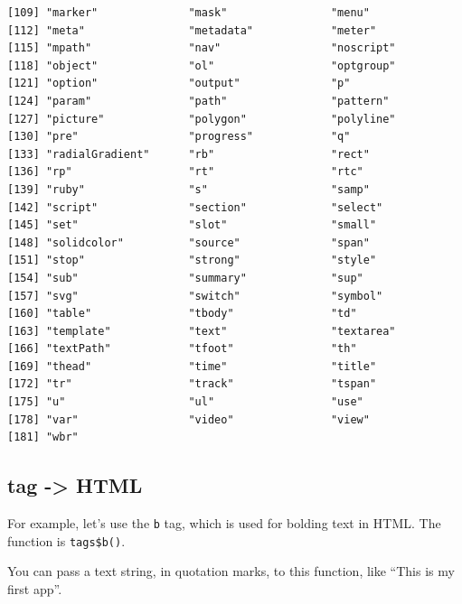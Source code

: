 \documentclass[
  letterpaper,
  DIV=11,
  numbers=noendperiod]{scrreprt}
\newenvironment{Shaded}{\begin{snugshade}}{\end{snugshade}}
\newcommand{\FunctionTok}[1]{\textcolor[rgb]{0.28,0.35,0.67}{#1}}
\newcommand{\NormalTok}[1]{\textcolor[rgb]{0.00,0.46,0.62}{#1}}
\newcommand{\SpecialCharTok}[1]{\textcolor[rgb]{0.37,0.37,0.37}{#1}}
\newcommand{\StringTok}[1]{\textcolor[rgb]{0.13,0.47,0.30}{#1}}
\begin{document}
\begin{verbatim}
[109] "marker"              "mask"                "menu"               
[112] "meta"                "metadata"            "meter"              
[115] "mpath"               "nav"                 "noscript"           
[118] "object"              "ol"                  "optgroup"           
[121] "option"              "output"              "p"                  
[124] "param"               "path"                "pattern"            
[127] "picture"             "polygon"             "polyline"           
[130] "pre"                 "progress"            "q"                  
[133] "radialGradient"      "rb"                  "rect"               
[136] "rp"                  "rt"                  "rtc"                
[139] "ruby"                "s"                   "samp"               
[142] "script"              "section"             "select"             
[145] "set"                 "slot"                "small"              
[148] "solidcolor"          "source"              "span"               
[151] "stop"                "strong"              "style"              
[154] "sub"                 "summary"             "sup"                
[157] "svg"                 "switch"              "symbol"             
[160] "table"               "tbody"               "td"                 
[163] "template"            "text"                "textarea"           
[166] "textPath"            "tfoot"               "th"                 
[169] "thead"               "time"                "title"              
[172] "tr"                  "track"               "tspan"              
[175] "u"                   "ul"                  "use"                
[178] "var"                 "video"               "view"               
[181] "wbr"                
\end{verbatim}

\hypertarget{tag---html}{%
\subsection{tag -\textgreater{} HTML}\label{tag---html}}

For example, let's use the \texttt{b} tag, which is used for bolding
text in HTML. The function is \texttt{tags\$b()}.

You can pass a text string, in quotation marks, to this function, like
``This is my first app''.

\begin{Shaded}
\end{Shaded}
\end{document}
